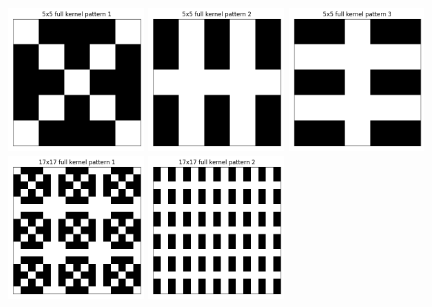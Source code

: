 \documentclass[a4paper]{article}
\begin{document}
	\begin{figure}[H]
		\centering
		\includegraphics[width=0.32\textwidth]{5x5_kernel_full_1.png}
		\includegraphics[width=0.32\textwidth]{5x5_kernel_full_2.png}
		\includegraphics[width=0.32\textwidth]{5x5_kernel_full_3.png}
		\includegraphics[width=0.32\textwidth]{17x17_kernel_full_1.png}
		\includegraphics[width=0.32\textwidth]{17x17_kernel_full_2.png}

\end{figure}
\end{document}
